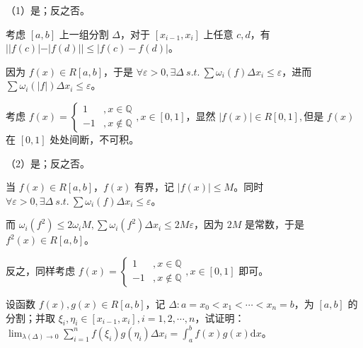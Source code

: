 （1）是；反之否。

考虑 $\displaystyle [ a,b]$ 上一组分割 $\displaystyle \Delta $，对于 $\displaystyle [ x_{i-1} ,x_{i}]$ 上任意 $\displaystyle c,d$，有 $\displaystyle ||f( c) |-|f( d) ||\leqslant |f( c) -f( d) |$。

因为 $\displaystyle f( x) \in R[ a,b]$，于是 $\displaystyle \forall \varepsilon  >0,\exists \Delta \ s.t.\ \sum \omega _{i}( f) \Delta x_{i} \leqslant \varepsilon $，进而 $\displaystyle \sum \omega _{i}( |f|) \Delta x_{i} \leqslant \varepsilon $。



考虑 $\displaystyle f( x) =\begin{cases}
1 & ,x\in \mathbb{Q}\\
-1 & ,x\notin \mathbb{Q}
\end{cases} ,x\in [ 0,1]$，显然 $\displaystyle |f( x) |\in R[ 0,1] ,$但是 $\displaystyle f( x)$ 在 $\displaystyle [ 0,1]$ 处处间断，不可积。





（2）是；反之否。

当 $\displaystyle f( x) \in R[ a,b]$，$\displaystyle f( x)$ 有界，记 $\displaystyle |f( x) |\leqslant M$。同时 $\displaystyle \forall \varepsilon  >0,\exists \Delta \ s.t.\ \sum \omega _{i}( f) \Delta x_{i} \leqslant \varepsilon $。

而 $\displaystyle \omega _{i}\left( f^{2}\right) \leqslant 2\omega _{i} M,\sum \omega _{i}\left( f^{2}\right) \Delta x_{i} \leqslant 2M\varepsilon $，因为 $\displaystyle 2M$ 是常数，于是 $\displaystyle f^{2}( x) \in R[ a,b]$。



反之，同样考虑 $\displaystyle f( x) =\begin{cases}
1 & ,x\in \mathbb{Q}\\
-1 & ,x\notin \mathbb{Q}
\end{cases} ,x\in [ 0,1]$ 即可。





\begin{ques}
	设函数 $\displaystyle f( x) ,g( x) \in R[ a,b]$，记 $\displaystyle \Delta :a=x_{0} < x_{1} < \cdots < x_{n} =b$，为 $\displaystyle [ a,b]$ 的分割；并取 $\displaystyle \xi _{i} ,\eta _{i} \in [ x_{i-1} ,x_{i}] ,i=1,2,\cdots ,n$，试证明：$\displaystyle \lim _{\lambda ( \Delta )\rightarrow 0}\sum _{i=1}^{n} f( \xi _{i}) g( \eta _{i}) \Delta x_{i} =\int _{a}^{b} f( x) g( x)\mathrm{d} x$。

\end{ques}



